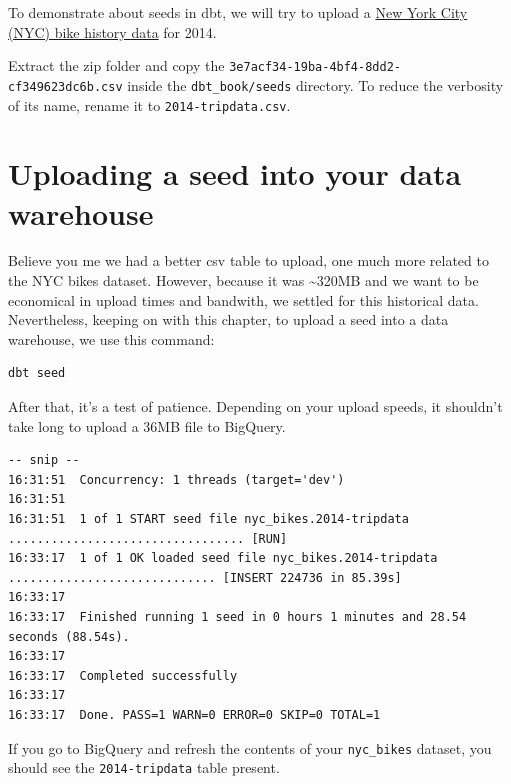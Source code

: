 \documentclass[
]{book}
\begin{document}
To demonstrate about seeds in dbt, we will try to upload a \href{https://www.civicdata.com/dataset/nyc-bike-share-trip-data/resource/3e7acf34-19ba-4bf4-8dd2-cf349623dc6b}{New York City (NYC) bike history data} for 2014.

Extract the zip folder and copy the \texttt{3e7acf34-19ba-4bf4-8dd2-cf349623dc6b.csv} inside the \texttt{dbt\_book/seeds} directory. To reduce the verbosity of its name, rename it to \texttt{2014-tripdata.csv}.

\hypertarget{uploading-a-seed-into-your-data-warehouse}{%
\section{Uploading a seed into your data warehouse}\label{uploading-a-seed-into-your-data-warehouse}}

Believe you me we had a better csv table to upload, one much more related to the NYC bikes dataset. However, because it was \textasciitilde320MB and we want to be economical in upload times and bandwith, we settled for this historical data. Nevertheless, keeping on with this chapter, to upload a seed into a data warehouse, we use this command:

\begin{verbatim}
dbt seed
\end{verbatim}

After that, it's a test of patience. Depending on your upload speeds, it shouldn't take long to upload a 36MB file to BigQuery.

\begin{verbatim}
-- snip --
16:31:51  Concurrency: 1 threads (target='dev')
16:31:51  
16:31:51  1 of 1 START seed file nyc_bikes.2014-tripdata ................................. [RUN]
16:33:17  1 of 1 OK loaded seed file nyc_bikes.2014-tripdata ............................. [INSERT 224736 in 85.39s]
16:33:17  
16:33:17  Finished running 1 seed in 0 hours 1 minutes and 28.54 seconds (88.54s).
16:33:17  
16:33:17  Completed successfully
16:33:17  
16:33:17  Done. PASS=1 WARN=0 ERROR=0 SKIP=0 TOTAL=1
\end{verbatim}

If you go to BigQuery and refresh the contents of your \texttt{nyc\_bikes} dataset, you should see the \texttt{2014-tripdata} table present.
\end{document}
